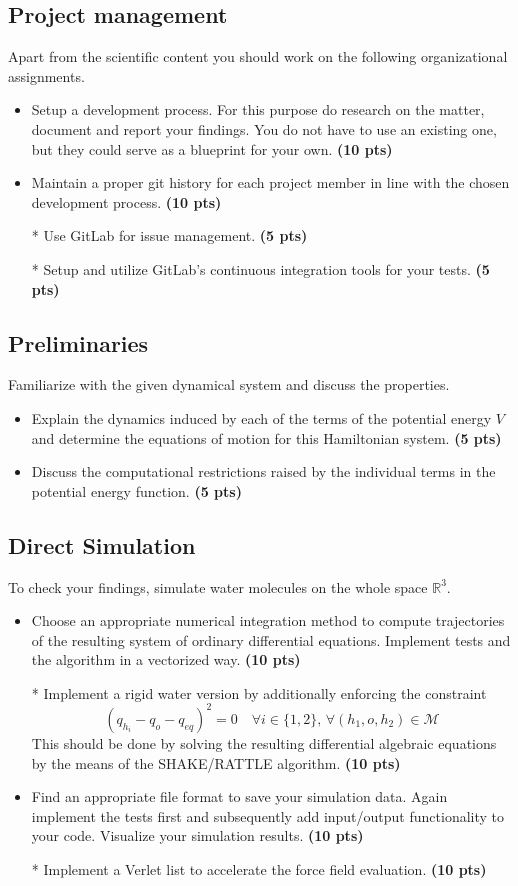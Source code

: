 \documentclass[a4paper,11pt]{amsart}
\begin{document}
\subsection{Project management}
Apart from the scientific content you should work on the following organizational assignments.
%
\begin{itemize}
	\item Setup a development process. For this purpose do research on the matter, document and report your findings. You do not have to use an existing one, but they could serve as a blueprint for your own.  
	\textbf{(10 pts)}
	\item Maintain a proper git history for each project member in line with the chosen development process. \textbf{(10 pts)}
	\item[*] Use GitLab for issue management. \textbf{(5 pts)}
	\item[*] Setup and utilize GitLab's continuous integration tools for your tests. \textbf{(5 pts)}
\end{itemize}
%
\subsection{Preliminaries}
Familiarize with the given dynamical system and discuss the properties.
\begin{itemize}
  \item Explain the dynamics induced by each of the terms of the potential energy \(V\) and determine the equations of motion for this Hamiltonian system. \textbf{(5 pts)}
  \item Discuss the computational restrictions raised by the individual terms in the potential energy function. \textbf{(5 pts)}
\end{itemize}
\subsection{Direct Simulation}
To check your findings, simulate water molecules on the whole space \(\mathbb{R}^3\).  
\begin{itemize}
  \item Choose an appropriate numerical integration method to compute 
  trajectories of the resulting system of ordinary differential equations. Implement tests and the algorithm in a vectorized way. \textbf{(10 pts)}
  \item[*] Implement a rigid water version by additionally enforcing the constraint
  \begin{equation}
    (q_{h_i} - q_o - q_{eq})^2 = 0 \quad \forall i \in \{1,2\}, \, \forall (h_1,o,h_2) \in \mathcal{M}
  \end{equation}
  This should be done by solving the resulting differential algebraic equations by the means of the SHAKE/RATTLE algorithm. \textbf{(10 pts)}
	\item Find an appropriate file format to save your simulation data. Again
	implement the tests first and subsequently add input/output functionality
	to your code.
  Visualize your simulation results. \textbf{(10 pts)}
  \item[*] Implement a Verlet list to accelerate the force field evaluation. \textbf{(10 pts)}
\end{itemize}
\end{document}

